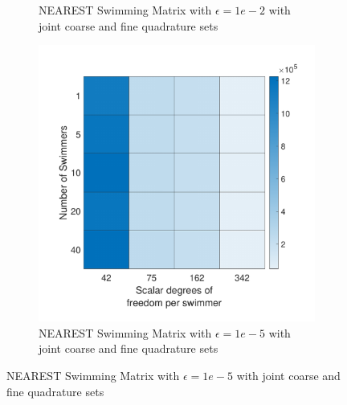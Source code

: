 \begin{figure}
\begin{subfigure}{0.3\textwidth}
        \caption{NEAREST Swimming Matrix with $\epsilon=1e-2$ with joint coarse and fine quadrature sets}    
    \end{subfigure}
    \begin{subfigure}{0.3\textwidth}
        \includegraphics[width=\linewidth]{Images/Condition/Mobility Matrix using Contained NEAREST-5.pdf}
        \caption{NEAREST Swimming Matrix with $\epsilon=1e-5$ with joint coarse and fine quadrature sets}    
    \end{subfigure}
\end{figure}

